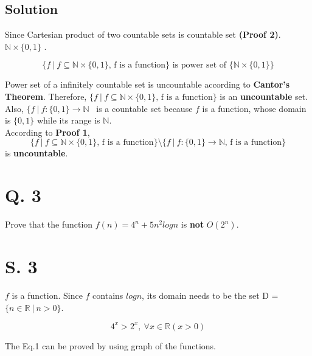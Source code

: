 \documentclass[11pt]{article}
\begin{document}
\subsection*{Solution}

Since Cartesian product of two countable sets is countable set \textbf{(Proof 2)}. $\mathbb{N} \times \{0, 1\}$ . 

\begin{equation*}
    \{f\ |\ f \subseteq \mathbb{N} \times \{0, 1\} \text{, f is a function}\} \text{ is power set of } \{\mathbb{N} \times \{0, 1\}\}
\end{equation*}

Power set of a infinitely countable set is uncountable according to \textbf{Cantor's Theorem}. Therefore, $\{f\ |\ f \subseteq \mathbb{N} \times \{0, 1\} \text{, f is a function}\}$ is an \textbf{uncountable} set.\\

Also, $\{f\ |\ f : \{0, 1\} \rightarrow \mathbb{N}$ \ is a countable set because $f$ is a function, whose domain is $\{0, 1\}$ while its range is $\mathbb{N}$.\\

According to \textbf{Proof 1},
\begin{equation*}
    \{f\ |\ f \subseteq \mathbb{N} \times \{0, 1\} \text{, f is a function}\} \setminus \{f\ |\ f : \{0, 1\} \rightarrow \mathbb{N} \text{, f is a function}\}
\end{equation*}
is \textbf{uncountable}.

\newpage

\section*{Q. 3}
Prove that the function $f(n) = 4^n + 5n^2logn$ is \textbf{not} $O(2^n)$.

\section*{S. 3}
$f$ is a function. Since $f$ contains $logn$, its domain needs to be the set D = $\{n \in \mathbb{R}\ |\ n > 0 \}$.

\begin{equation}
    4^x > 2^x,\ \forall x \in \mathbb{R}(x > 0)
\end{equation}

The Eq.1 can be proved by using graph of the functions.\\
\end{document}
